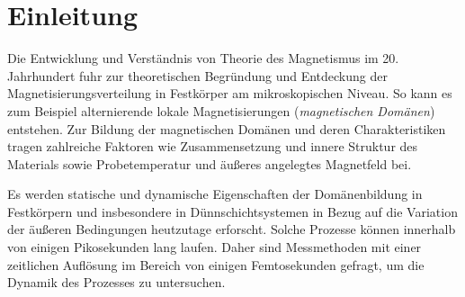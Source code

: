 \chapter{Einleitung}
\label{text:einleitung}


Die Entwicklung und Verständnis von Theorie des Magnetismus im 20. Jahrhundert fuhr zur theoretischen Begründung und Entdeckung der Magnetisierungsverteilung in Festkörper am mikroskopischen Niveau. So kann es zum Beispiel alternierende lokale Magnetisierungen (\emph{magnetischen Domänen}) entstehen. Zur Bildung der magnetischen Domänen und deren Charakteristiken tragen zahlreiche Faktoren wie Zusammensetzung und innere Struktur des Materials sowie Probetemperatur und äußeres angelegtes Magnetfeld bei.

\noindent
Es werden statische und dynamische Eigenschaften der Domänenbildung in Festkörpern und insbesondere in Dünnschichtsystemen in Bezug auf die Variation der äußeren Bedingungen heutzutage erforscht. Solche Prozesse können innerhalb von einigen Pikosekunden lang laufen. Daher sind Messmethoden mit einer zeitlichen Auflösung im Bereich von einigen Femtosekunden gefragt, um die Dynamik des Prozesses zu untersuchen.

